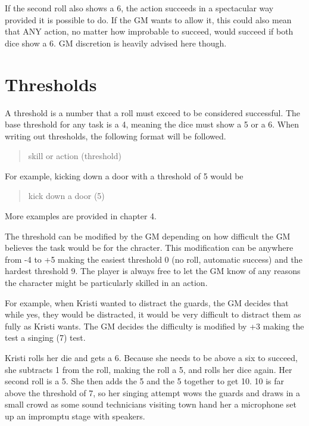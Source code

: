 \begin{flushleft}
If the second roll also shows a 6, the action succeeds in a spectacular way
provided it is possible to do. If the GM wants to allow it, this could also
mean that ANY action, no matter how improbable to succeed, would succeed if
both dice show a 6. GM discretion is heavily advised here though.

\section*{Thresholds}

A threshold is a number that a roll must exceed to be considered successful.
The base threshold for any task is a 4, meaning  the dice must show a 5 or a 6.
When writing out thresholds, the following format will be followed.

\begin{quotation}
\centering
    skill or action (threshold)
\end{quotation}

For example, kicking down a door with a threshold of 5 would be

\begin{quotation}
\centering
    kick down a door (5)
\end{quotation}

More examples are provided in chapter 4.

The threshold can be modified by the GM depending on how difficult the GM
believes the task would be for the chracter. This modification can be anywhere
from -4 to +5 making the easiest threshold 0 (no roll, automatic success) and
the hardest threshold 9. The player is always free to let the GM know of any
reasons the character might be particularly skilled in an action.

For example, when Kristi wanted to distract the guards, the GM decides that
while yes, they would be distracted, it would be very difficult to distract
them as fully as Kristi wants. The GM decides the difficulty is modified by
+3 making the test a singing (7) test.

Kristi rolls her die and gets a 6. Because she needs to be above a six
to succeed, she subtracts 1 from the roll, making the roll a 5, and rolls her
dice again. Her second roll is a 5. She then adds the 5 and the 5 together to
get 10. 10 is far above the threshold of 7, so her singing attempt wows the
guards and draws in a small crowd as some sound technicians visiting town hand
her a microphone set up an impromptu stage with speakers.


\end{flushleft}
